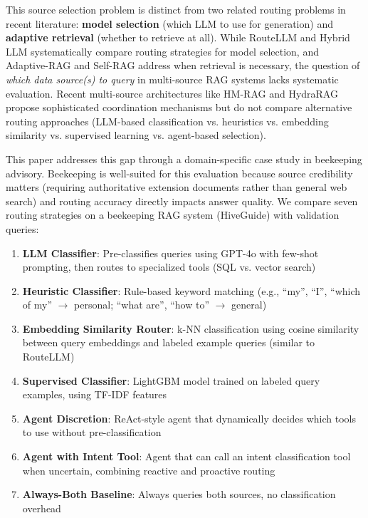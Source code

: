 \documentclass[twocolumn,10pt]{article}
\begin{document}
This source selection problem is distinct from two related routing problems in recent literature: \textbf{model selection} (which LLM to use for generation) and \textbf{adaptive retrieval} (whether to retrieve at all). While RouteLLM and Hybrid LLM systematically compare routing strategies for model selection, and Adaptive-RAG and Self-RAG address when retrieval is necessary, the question of \emph{which data source(s) to query} in multi-source RAG systems lacks systematic evaluation. Recent multi-source architectures like HM-RAG and HydraRAG propose sophisticated coordination mechanisms but do not compare alternative routing approaches (LLM-based classification vs. heuristics vs. embedding similarity vs. supervised learning vs. agent-based selection).

This paper addresses this gap through a domain-specific case study in beekeeping advisory. Beekeeping is well-suited for this evaluation because source credibility matters (requiring authoritative extension documents rather than general web search) and routing accuracy directly impacts answer quality. We compare seven routing strategies on a beekeeping RAG system (HiveGuide) with validation queries:

\begin{enumerate}
\item \textbf{LLM Classifier}: Pre-classifies queries using GPT-4o with few-shot prompting, then routes to specialized tools (SQL vs. vector search)
\item \textbf{Heuristic Classifier}: Rule-based keyword matching (e.g., ``my'', ``I'', ``which of my'' $\rightarrow$ personal; ``what are'', ``how to'' $\rightarrow$ general)
\item \textbf{Embedding Similarity Router}: k-NN classification using cosine similarity between query embeddings and labeled example queries (similar to RouteLLM)
\item \textbf{Supervised Classifier}: LightGBM model trained on labeled query examples, using TF-IDF features
\item \textbf{Agent Discretion}: ReAct-style agent that dynamically decides which tools to use without pre-classification
\item \textbf{Agent with Intent Tool}: Agent that can call an intent classification tool when uncertain, combining reactive and proactive routing
\item \textbf{Always-Both Baseline}: Always queries both sources, no classification overhead
\end{enumerate}
\end{document}
